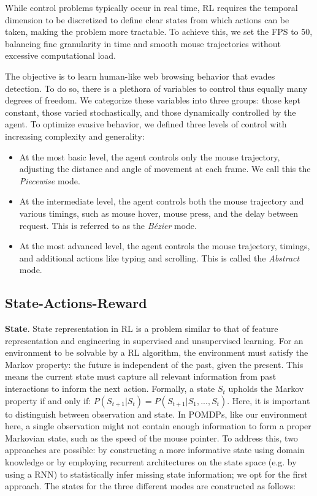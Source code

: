 While control problems typically occur in real time, \gls{RL} requires the temporal dimension to be discretized to define clear states from which actions can be taken, making the problem more tractable.
To achieve this, we set the \gls{FPS} to 50, balancing fine granularity in time and smooth mouse trajectories without excessive computational load.

The objective is to learn human-like web browsing behavior that evades detection. 
To do so, there is a plethora of variables to control thus equally many degrees of freedom.
We categorize these variables into three groups: those kept constant, those varied stochastically, and those dynamically controlled by the agent. To optimize evasive behavior, we defined three levels of control with increasing complexity and generality:

\begin{itemize}
  \item At the most basic level, the agent controls only the mouse trajectory, adjusting the distance and angle of movement at each frame. We call this the \emph{Piecewise} mode.
  \item At the intermediate level, the agent controls both the mouse trajectory and various timings, such as mouse hover, mouse press, and the delay between request. This is referred to as the \emph{Bézier} mode.
  \item At the most advanced level, the agent controls the mouse trajectory, timings, and additional actions like typing and scrolling. This is called the \emph{Abstract} mode.
 \end{itemize}

\subsection{State-Actions-Reward}

\textbf{State}. State representation in \gls{RL} is a problem similar to that of feature representation and engineering in supervised and unsupervised learning.
For an environment to be solvable by a \gls{RL} algorithm, the environment must satisfy the Markov property: the future is independent of the past, given the present.
This means the current state must capture all relevant information from past interactions to inform the next action.
Formally, a state $S_t$ upholds the Markov property if and only if: $P(S_{t+1} | S_t) = P(S_{t+1} | S_1,..., S_t)$.
Here, it is important to distinguish between observation and state.
In \gls{POMDP}s, like our environment here, a single observation might not contain enough information to form a proper Markovian state, such as the speed of the mouse pointer.
To address this, two approaches are possible: by constructing a more informative state using domain knowledge or by employing recurrent architectures on the state space (e.g. by using a \gls{RNN}) to statistically infer missing state information; we opt for the first approach.
The states for the three different modes are constructed as follows:

